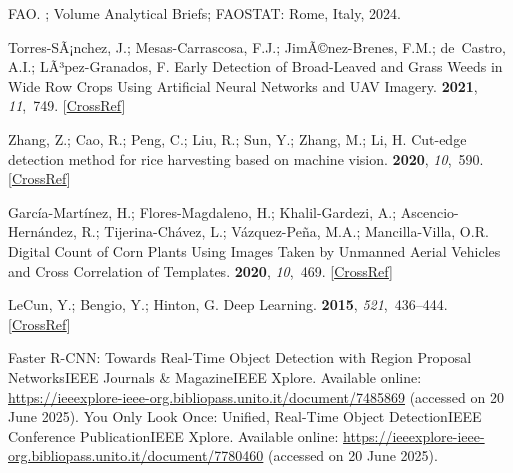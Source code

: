 \documentclass[12pt,a4paper,oneside]{report}
\begin{document}
\begin{thebibliography}{999}
{FAO}.
; Volume Analytical Briefs; FAOSTAT:
Rome, Italy, 2024.

Torres-SÃ¡nchez, J.; Mesas-Carrascosa, F.J.; JimÃ©nez-Brenes, F.M.; de~Castro,
A.I.; LÃ³pez-Granados, F.
\newblock Early {Detection} of {Broad}-{Leaved} and {Grass} {Weeds} in {Wide}
{Row} {Crops} {Using} {Artificial} {Neural} {Networks} and {UAV} {Imagery}.
 {\bf 2021}, {\em 11},~749. [\href{http://dx.doi.org/10.3390/agronomy11040749}{CrossRef}]

Zhang, Z.; Cao, R.; Peng, C.; Liu, R.; Sun, Y.; Zhang, M.; Li, H.
\newblock Cut-edge detection method for rice harvesting based on machine
vision.
 {\bf 2020}, {\em 10},~590. [\href{http://dx.doi.org/10.3390/agronomy10040590}{CrossRef}]

{Garc{\'i}a-Mart{\'i}nez}, H.; {Flores-Magdaleno}, H.; {Khalil-Gardezi}, A.;
{Ascencio-Hern{\'a}ndez}, R.; {Tijerina-Ch{\'a}vez}, L.;
{V{\'a}zquez-Pe{\~n}a}, M.A.; {Mancilla-Villa}, O.R.
\newblock Digital {{Count}} of {{Corn Plants Using Images Taken}} by {{Unmanned
Aerial Vehicles}} and {{Cross Correlation}} of {{Templates}}.
 {\bf 2020}, {\em 10},~469. [\href{http://dx.doi.org/10.3390/agronomy10040469}{CrossRef}]

LeCun, Y.; Bengio, Y.; Hinton, G.
\newblock Deep Learning.
 {\bf 2015}, {\em 521},~436--444. [\href{http://dx.doi.org/10.1038/nature14539}{CrossRef}]

Faster {{R-CNN}}: {{Towards Real-Time Object Detection}} with {{Region Proposal
Networks}}{\textbar}{{IEEE Journals}} \& {{Magazine}}{\textbar}{{IEEE
Xplore}}.
\newblock Available online: \url{https://ieeexplore-ieee-org.bibliopass.unito.it/document/7485869} (accessed on 20 June 2025).
\newpage
{}
You {{Only Look Once}}: {{Unified}}, {{Real-Time Object Detection}}{\textbar}{{IEEE Conference Publication}}{\textbar}{{IEEE Xplore}}.
\newblock Available online: \url{https://ieeexplore-ieee-org.bibliopass.unito.it/document/7780460} (accessed on 20 June 2025).


\end{thebibliography}
\end{document}

